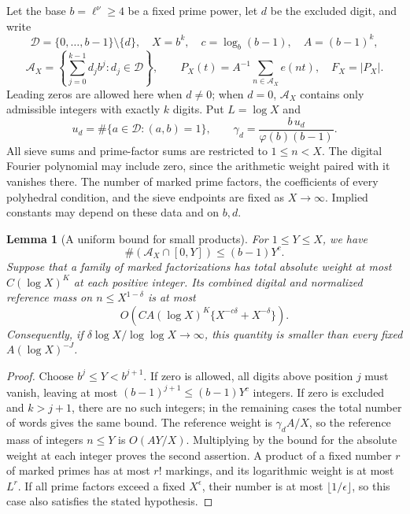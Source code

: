 \documentclass[11pt,a4paper]{article}
\theoremstyle{paperplain}
\newtheorem{lemma}[theorem]{Lemma}
\numberwithin{equation}{section}
\begin{document}
Let the base $b=\ell^\nu\ge4$ be a fixed prime power, let $d$ be the excluded
digit, and write
\[
 \mathcal D=\{0,\ldots,b-1\}\setminus\{d\},\quad
 X=b^k,\quad c=\log_b(b-1),\quad A=(b-1)^k,
\]
\[
 \mathcal A_X=\left\{\sum_{j=0}^{k-1}d_jb^j:d_j\in\mathcal D\right\},
 \qquad P_X(t)=A^{-1}\sum_{n\in\mathcal A_X}e(nt),\quad F_X=|P_X|.
\]
Leading zeros are allowed here when $d\ne0$; when $d=0$, $\mathcal A_X$
contains only admissible integers with exactly $k$ digits. Put $L=\log X$
and
\begin{equation}\label{arith:localfactor}
 u_d=\#\{a\in\mathcal D:(a,b)=1\},\qquad
 \gamma_d=\frac{b\,u_d}{\varphi(b)(b-1)}.
\end{equation}
All sieve sums and prime-factor sums are restricted to $1\le n<X$.
The digital Fourier polynomial may include zero, since the arithmetic
weight paired with it vanishes there.
The number of marked prime factors, the coefficients of every polyhedral
condition, and the sieve endpoints are fixed as $X\to\infty$.
Implied constants may depend on these data and on $b,d$.
\begin{lemma}[A uniform bound for small products]\label{arith:small}
For $1\le Y\le X$, we have
\[
 \#(\mathcal A_X\cap[0,Y])\le(b-1)Y^c.
\]
Suppose that a family of marked factorizations has total absolute weight
at most $C(\log X)^K$ at each positive integer. Its combined digital and
normalized reference mass on $n\le X^{1-\delta}$ is at most
\begin{equation}\label{arith:small-bound}
 O\left(CA(\log X)^K
       \{X^{-c\delta}+X^{-\delta}\}\right).
\end{equation}
Consequently, if $\delta\log X/\log\log X\to\infty$, this quantity is
smaller than every fixed $A(\log X)^{-J}$.
\end{lemma}
\begin{proof}
Choose $b^j\le Y<b^{j+1}$. If zero is allowed, all digits above position
$j$ must vanish, leaving at most $(b-1)^{j+1}\le(b-1)Y^c$ integers.
If zero is excluded and $k>j+1$, there are no such integers; in the
remaining cases the total number of words gives the same bound.
The reference weight is $\gamma_d A/X$, so the reference mass of integers
$n\le Y$ is $O(AY/X)$. Multiplying by the bound for the absolute weight
at each integer proves the second assertion.
A product of a fixed number $r$ of marked primes has at most $r!$
markings, and its logarithmic weight is at most $L^r$. If all prime
factors exceed a fixed $X^\epsilon$, their number is at most
$\lfloor1/\epsilon\rfloor$, so this case also satisfies the stated
hypothesis.
\end{proof}
\end{document}
